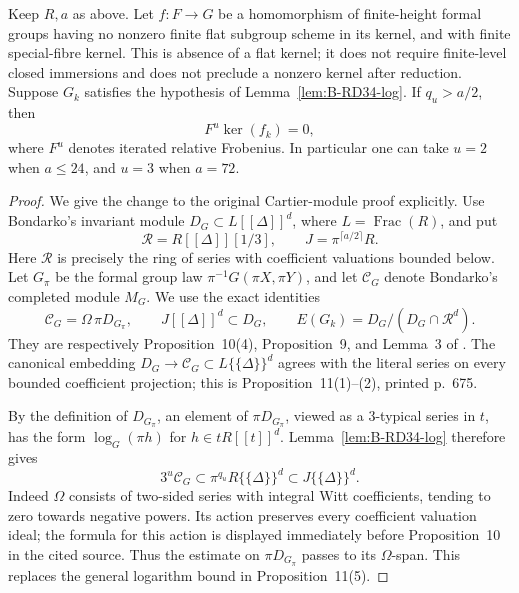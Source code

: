 \begin{lemma}
\label{lem:B-RD34-kernel}
Keep $R,a$ as above. Let $f:F\to G$ be a homomorphism of finite-height
formal groups having no nonzero finite flat subgroup scheme in its
kernel, and with finite special-fibre kernel. This is absence of a
flat kernel; it does not require finite-level closed immersions and
does not preclude a nonzero kernel after reduction. Suppose $G_k$
satisfies the hypothesis of
Lemma~\ref{lem:B-RD34-log}. If $q_u>a/2$, then
\[
                         F^u\ker(f_k)=0,
                                                        \tag{B-RD34.5}
\]
where $F^u$ denotes iterated relative Frobenius. In particular one can
take $u=2$ when $a\leq24$, and $u=3$ when $a=72$.
\end{lemma}
\begin{proof}
We give the change to the original Cartier-module proof explicitly.
Use Bondarko's invariant module $D_G\subset L[[\Delta]]^d$, where
$L=\operatorname{Frac}(R)$, and put
\[
 \mathcal R=R[[\Delta]][1/3],\qquad
 J=\pi^{\lceil a/2\rceil}R.
\]
Here $\mathcal R$ is precisely the ring of series with coefficient
valuations bounded below. Let $G_\pi$ be the formal group law
$\pi^{-1}G(\pi X,\pi Y)$, and let $\mathcal C_G$ denote Bondarko's
completed module $M_G$. We use the exact identities
\[
 \mathcal C_G=\Omega\,\pi D_{G_\pi},\qquad
 J[[\Delta]]^d\subset D_G,\qquad
 E(G_k)=D_G/(D_G\cap\mathcal R^d).
                                                        \tag{B-RD34.6}
\]
They are respectively Proposition~10(4), Proposition~9, and Lemma~3
of \cite[printed pp.~674--675]{Bondarko2006Generic}. The canonical
embedding $D_G\to\mathcal C_G\subset L\{\{\Delta\}\}^d$ agrees
with the literal series on every bounded coefficient projection;
this is Proposition~11(1)--(2), printed p.~675.

By the definition of $D_{G_\pi}$, an element of $\pi D_{G_\pi}$,
viewed as a $3$-typical series in $t$, has the form
$\log_G(\pi h)$ for $h\in tR[[t]]^d$.
Lemma~\ref{lem:B-RD34-log} therefore gives
\[
             3^u\mathcal C_G
                  \subset\pi^{q_u}R\{\{\Delta\}\}^d
                  \subset J\{\{\Delta\}\}^d.
                                                        \tag{B-RD34.7}
\]
Indeed $\Omega$ consists of two-sided series with integral Witt
coefficients, tending to zero towards negative powers. Its action
preserves every coefficient valuation ideal; the formula for this
action is displayed immediately before Proposition~10 in the cited
source. Thus the estimate on $\pi D_{G_\pi}$ passes to its
$\Omega$-span. This replaces the general logarithm bound in
Proposition~11(5).


\end{proof}
